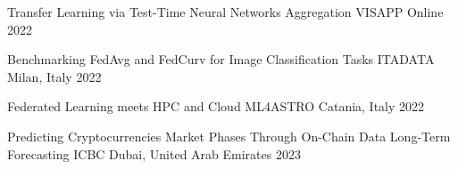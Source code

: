 



\begin{cvhonors}

  \cvhonor
    {Transfer Learning via Test-Time Neural Networks Aggregation} %
    {VISAPP} %
    {Online} %
    {2022} %

  \cvhonor
    {Benchmarking FedAvg and FedCurv for Image Classification Tasks} %
    {ITADATA} %
    {Milan, Italy} %
    {2022} %

  \cvhonor
    {Federated Learning meets HPC and Cloud} %
    {ML4ASTRO} %
    {Catania, Italy} %
    {2022} %

  \cvhonor
    {Predicting Cryptocurrencies Market Phases Through On-Chain Data Long-Term Forecasting} %
    {ICBC} %
    {Dubai, United Arab Emirates} %
    {2023} %

\end{cvhonors}





